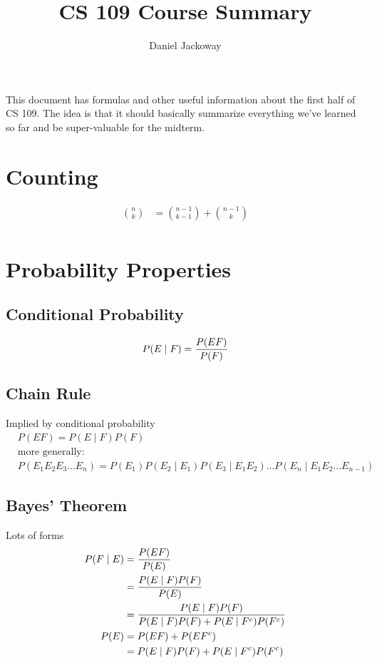 \documentclass[12pt]{amsart}
\title{CS 109 Course Summary}
\author{Daniel Jackoway}
\begin{document}
\maketitle

This document has formulas and other useful information about the first half of CS 109. The idea is that it should basically summarize everything we've learned so far and be super-valuable for the midterm.

\section{Counting}
\begin{align*}
{n \choose k} &= {n-1 \choose k-1} + {n-1 \choose k} \\
\end{align*}

\section{Probability Properties}
%
\subsection{Conditional Probability}
\[
P(E \mid F) = {P(EF) \over P(F)}
\]
\subsection{Chain Rule}
Implied by conditional probability
\begin{align*}
&P(EF) = P(E \mid F) P(F) \\
&\text{more generally:} \\
&P(E_1 E_2 E_3 ... E_n) = P(E_1) P(E_2 \mid E_1) P(E_3 \mid E_1 E_2) ... P(E_n \mid E_1 E_2 ... E_{n-1})
\end{align*}
%
\subsection{Bayes' Theorem} Lots of forms
\begin{align*}
P(F \mid E) &= {P(EF) \over P(E)} \\
&= {P(E \mid F) P(F) \over P(E)} \\
&= {P(E \mid F) P(F) \over P(E \mid F) P(F) + P(E \mid F^c) P(F^c)} \\
P(E) &= P(EF) + P(EF^c) \\
&= P(E \mid F) P(F) + P(E \mid F^c) P(F^c)
\end{align*}
\end{document}
